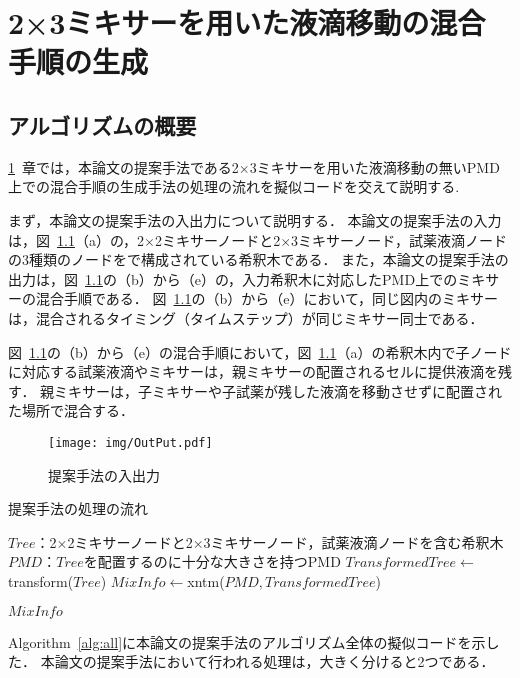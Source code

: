\chapter{{2×3ミキサーを用いた液滴移動の混合手順の生成}}
\label{proposed}
\section{アルゴリズムの概要}
\ref{proposed}~章では，本論文の提案手法である2$\times$3ミキサーを用いた液滴移動の無いPMD上での混合手順の生成手法の処理の流れを擬似コードを交えて説明する.


まず，本論文の提案手法の入出力について説明する．
本論文の提案手法の入力は，図~\ref{fig:inputoutput}（a）の，2$\times$2ミキサーノードと2$\times$3ミキサーノード，試薬液滴ノードの3種類のノードをで構成されている希釈木である．
また，本論文の提案手法の出力は，図~\ref{fig:inputoutput}の（b）から（e）の，入力希釈木に対応したPMD上でのミキサーの混合手順である．
図~\ref{fig:inputoutput}の（b）から（e）において，同じ図内のミキサーは，混合されるタイミング（タイムステップ）が同じミキサー同士である．

図~\ref{fig:inputoutput}の（b）から（e）の混合手順において，図~\ref{fig:inputoutput}（a）の希釈木内で子ノードに対応する試薬液滴やミキサーは，親ミキサーの配置されるセルに提供液滴を残す．
親ミキサーは，子ミキサーや子試薬が残した液滴を移動させずに配置された場所で混合する．

\begin{figure}[tbp]
 \centering\texttt{[image: img/OutPut.pdf]}
 \caption{提案手法の入出力}\label{fig:inputoutput}
\end{figure}

\begin{algorithm}[tbp]
 \caption{提案手法の処理の流れ}\label{alg:all}
 \begin{algorithmic}[1]
     \Require $\mathit{Tree}$：2$\times$2ミキサーノードと2$\times$3ミキサーノード，試薬液滴ノードを含む希釈木 
     \Require $\mathit{PMD}$：$\mathit{Tree}$を配置するのに十分な大きさを持つPMD  
     \State $\mathit{TransformedTree} \gets$ transform($Tree$) \label{transform_pseudo}
     \State $\mathit{MixInfo \gets}$xntm($\mathit{PMD,TransformedTree}$)  \label{xntm_pseudo}

      \Return $\mathit{MixInfo}$
 \end{algorithmic}
\end{algorithm}
Algorithm~\ref{alg:all}に本論文の提案手法のアルゴリズム全体の擬似コードを示した．
本論文の提案手法において行われる処理は，大きく分けると2つである．

